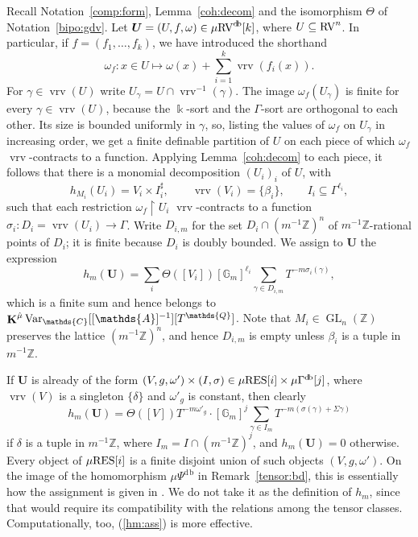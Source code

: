 \documentclass[12pt]{amsart}
\theoremstyle{plain}
\theoremstyle{definition}
\theoremstyle{remark}
\numberwithin{equation}{section}
\theoremstyle{plain}
\newcommand{\RV}{\textup{RV}}
\DeclareMathOperator{\K}{\mathds{k}}
\DeclareMathOperator{\GL}{GL}
\newcommand{\Z}{\mathds{Z}}
\newcommand{\A}{\mathds{A}}
\newcommand{\C}{\mathds{C}}
\newcommand{\G}{\mathds{G}}
\newcommand{\Q}{\mathds{Q}}
\newcommand{\0}{\emptyset}
\newcommand{\rest}{\upharpoonright}
\newcommand{\fun}{\longrightarrow}
\newcommand{\efun}{\longmapsto}
\newcommand{\sub}{\subseteq}
\newcommand{\mgRV}{{\mu}{\RV}}
\newcommand{\mG}{{\mu}{\Gamma}}
\newcommand{\RES}{\textup{RES}}
\newcommand{\mgRES}{{\mu}{\RES}}
\DeclareMathOperator{\ggk}{\mathbf{K}}
\DeclareMathOperator{\vrv}{vrv}
\DeclareMathOperator{\db}{d \! b}
\newcommand{\var}{\textup{Var}}
\newcommand{\gmv}{\ggk^{\hat \mu}\var_{\C}}
\begin{document}
Recall Notation~\ref{comp:form}, Lemma~\ref{coh:decom} and the isomorphism $\Theta$ of Notation~\ref{bipo:gdv}. Let $\bm U = (U, f, \omega) \in \mgRV^{\db}[k]$, where $U \sub \RV^n$. In particular, if $f=(f_1,\dots,f_k)$, we have introduced the shorthand
\[
\omega_{f}: x\in U \efun \omega(x)+\sum_{i=1}^k\vrv(f_i(x)).
\]
For $\gamma \in \vrv(U)$ write $U_\gamma = U \cap \vrv^{-1}(\gamma)$. The image $\omega_f(U_\gamma)$ is finite for every $\gamma \in \vrv(U)$, because the $\K$-sort and the $\Gamma$-sort are orthogonal to each other. Its size is bounded uniformly in $\gamma$, so, listing the values of $\omega_f$ on $U_\gamma$ in increasing order, we get a finite definable partition of $U$ on each piece of which $\omega_f$ $\vrv$-contracts to a function. Applying Lemma~\ref{coh:decom} to each piece, it follows that there is a monomial decomposition $(U_i)_i$ of $U$, with
\[
h_{M_i}(U_i) = V_i \times I_i^\sharp, \qquad \vrv(V_i) = \{\beta_i\}, \qquad I_i \sub \Gamma^{\ell_i},
\]
such that each restriction $\omega_f \rest U_i$ $\vrv$-contracts to a function $\sigma_i : D_i = \vrv(U_i) \fun \Gamma$. Write $D_{i,m}$ for the set $D_i \cap (m^{-1}\Z)^n$ of  $m^{-1}\Z$-rational points of $D_i$; it is finite because $D_i$ is doubly bounded. We assign to $\bm U$ the expression
\begin{equation}\label{hm:ass}
  h_m(\bm U) = \sum_i \Theta([V_i]) [\G_m]^{\ell_i} \sum_{\gamma \in D_{i,m}} T^{-m \sigma_i(\gamma)},
\end{equation}
which is  a finite sum and hence  belongs to $\gmv[[\A]^{-1}][T^{\Q}]$. Note that $M_i \in \GL_n(\Z)$ preserves the lattice $(m^{-1}\Z)^n$, and hence $D_{i,m}$ is empty unless $\beta_i$ is a tuple in $m^{-1}\Z$.

If $\bm U$ is already of the form $(V, g, \omega') \times (I, \sigma) \in \mgRES[i] \times \mG^{\db}[j]$, where $\vrv(V)$ is a singleton $\{\delta\}$ and $\omega'_g$ is constant, then clearly
\[
h_m(\bm U) = \Theta([V])T^{-m\omega'_g} \cdot [\G_m]^{j} \sum_{\gamma \in I_{m}} T^{-m (\sigma(\gamma) + \Sigma \gamma )}
\]
if $\delta$ is a tuple in $m^{-1}\Z$, where $I_m = I \cap (m^{-1}\Z)^j$, and $h_m(\bm U) = 0$ otherwise. Every object of $\mgRES[i]$ is a finite disjoint union of such objects $(V, g, \omega')$. On the image of the homomorphism ${\mu} \Psi^{\db}$ in Remark~\ref{tensor:bd}, this is essentially how the assignment is given in \cite[\S~8.2]{hru:loe:lef}. We do not take it as the definition of $h_m$, since that would require its compatibility with the relations among the tensor classes. Computationally, too,  (\ref{hm:ass}) is more effective.
\end{document}
